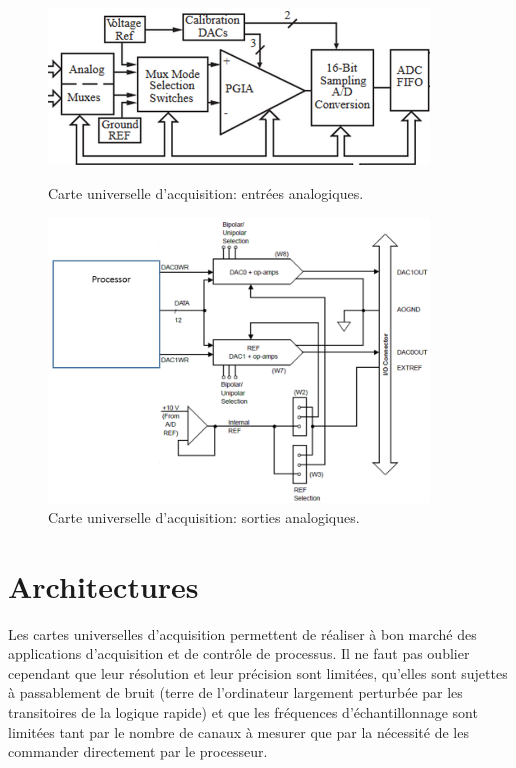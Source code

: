 \begin{figure}[p]
    \centering
	\includegraphics[width=0.9\textwidth]{assets/figures/2_9a_Analog_Frontend.PNG}
	\caption{Carte universelle d'acquisition: entrées analogiques.}
	\label{fig:Analog_Frontend}
	\vspace{5mm}
    \centering
	\includegraphics[width=0.9\textwidth]{assets/figures/2_9b_Sorties_analogiques.PNG}
	\caption{Carte universelle d'acquisition: sorties analogiques.}
	\label{fig:Sorties_analogiques}
\end{figure}

\section{Architectures}

Les cartes universelles d'acquisition permettent de réaliser à bon marché des applications d'acquisition et de contrôle de processus. Il ne faut pas oublier cependant que leur résolution et leur précision sont limitées, qu'elles sont sujettes à passablement de bruit (terre de l'ordinateur largement perturbée par les transitoires de la logique rapide) et que les fréquences d'échantillonnage sont limitées tant par le nombre de canaux à mesurer que par la nécessité de les commander directement par le processeur.


